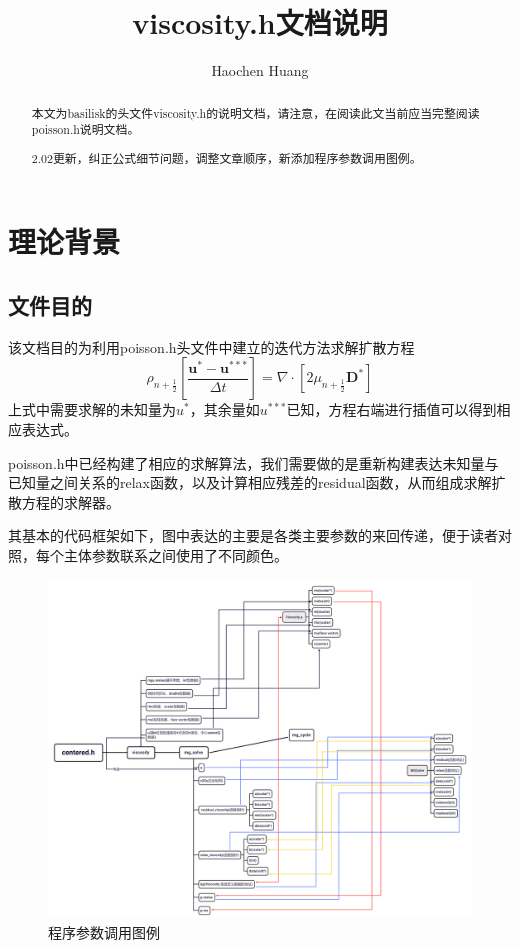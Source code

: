 \documentclass[lang=cn,11pt,a4paper]{elegantpaper}
\title{viscosity.h文档说明}
\author{Haochen Huang}
\institute{西安交通大学MFM课题组}
\date{\zhtoday}
\begin{document}
\maketitle
\tableofcontents

\begin{abstract}
本文为basilisk的头文件viscosity.h的说明文档，请注意，在阅读此文当前应当完整阅读poisson.h说明文档。\par
2.02更新，纠正公式细节问题，调整文章顺序，新添加程序参数调用图例。
\end{abstract}


\section{理论背景}

\subsection{文件目的}
该文档目的为利用poisson.h头文件中建立的迭代方法求解扩散方程
\begin{equation}\label{equ:main}
    \rho_{n+\frac{1}{2}}[\frac{\mathbf{u^*-u^{***}}}{\Delta t}]=\nabla\cdot[2\mu_{n+\frac{1}{2}}\mathbf{D^*}]
\end{equation}
上式中需要求解的未知量为$u^*$，其余量如$u^{***}$已知，方程右端进行插值可以得到相应表达式。\par
poisson.h中已经构建了相应的求解算法，我们需要做的是重新构建表达未知量与已知量之间关系的relax函数，以及计算相应残差的residual函数，从而组成求解扩散方程的求解器。\par
其基本的代码框架如下，图中表达的主要是各类主要参数的来回传递，便于读者对照，每个主体参数联系之间使用了不同颜色。
\begin{figure}[H]
    \centering
    \includegraphics[width=1.0\linewidth]{viscosity.png}
    \caption{程序参数调用图例}
    \label{fig:kuangjia}
\end{figure}
\end{document}
